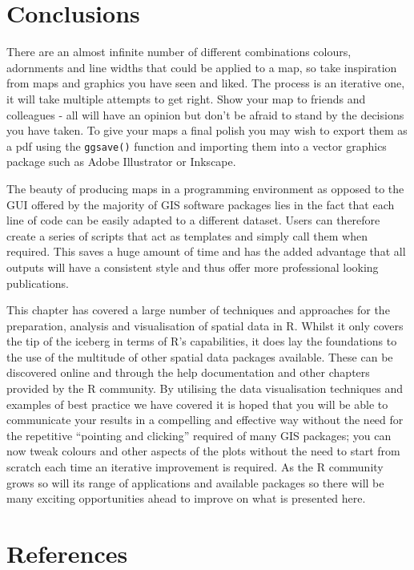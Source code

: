 \documentclass[]{article}
\begin{document}
\section{Conclusions}

There are an almost infinite number of different combinations colours,
adornments and line widths that could be applied to a map, so take
inspiration from maps and graphics you have seen and liked. The process
is an iterative one, it will take multiple attempts to get right. Show
your map to friends and colleagues - all will have an opinion but don't
be afraid to stand by the decisions you have taken. To give your maps a
final polish you may wish to export them as a pdf using the
\texttt{ggsave()} function and importing them into a vector graphics
package such as Adobe Illustrator or Inkscape.

The beauty of producing maps in a programming environment as opposed to
the GUI offered by the majority of GIS software packages lies in the
fact that each line of code can be easily adapted to a different
dataset. Users can therefore create a series of scripts that act as
templates and simply call them when required. This saves a huge amount
of time and has the added advantage that all outputs will have a
consistent style and thus offer more professional looking publications.

This chapter has covered a large number of techniques and approaches for
the preparation, analysis and visualisation of spatial data in R. Whilst
it only covers the tip of the iceberg in terms of R's capabilities, it
does lay the foundations to the use of the multitude of other spatial
data packages available. These can be discovered online and through the
help documentation and other chapters provided by the R community. By
utilising the data visualisation techniques and examples of best
practice we have covered it is hoped that you will be able to
communicate your results in a compelling and effective way without the
need for the repetitive ``pointing and clicking'' required of many GIS
packages; you can now tweak colours and other aspects of the plots
without the need to start from scratch each time an iterative
improvement is required. As the R community grows so will its range of
applications and available packages so there will be many exciting
opportunities ahead to improve on what is presented here.

\section{References}
\end{document}
